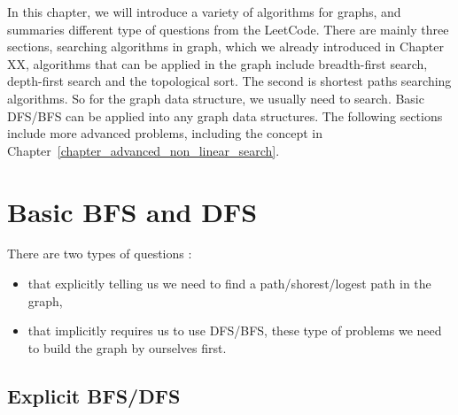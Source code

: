 \documentclass[../main.tex]{subfiles}
\begin{document}
In this chapter, we will introduce a variety of algorithms for graphs, and summaries different type of questions from the LeetCode. There are mainly three sections, searching algorithms in graph, which we already introduced in Chapter XX, algorithms that can be applied in the graph include breadth-first search, depth-first search and the topological sort. The second is shortest paths searching algorithms. So for the graph data structure, we usually need to search.  
Basic DFS/BFS can be applied into any graph data structures. The following sections include more advanced problems, including the concept in Chapter~\ref{chapter_advanced_non_linear_search}. 
\section{Basic BFS and DFS}
There are two types of questions :
\begin{itemize}
    \item that explicitly telling us we need to find a path/shorest/logest path in the graph,
    \item that implicitly requires us to use DFS/BFS, these type of problems we need to build the graph by ourselves first. 
\end{itemize}
\subsection{Explicit BFS/DFS}
\end{document}
